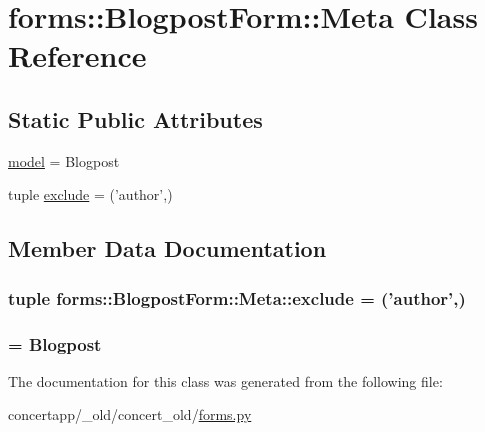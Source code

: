 \hypertarget{classforms_1_1_blogpost_form_1_1_meta}{
\section{forms::BlogpostForm::Meta Class Reference}
\label{classforms_1_1_blogpost_form_1_1_meta}
}
\subsection*{Static Public Attributes}
\begin{DoxyCompactItemize}
\item 
\hyperlink{classforms_1_1_blogpost_form_1_1_meta_ae7a64df056cc1bae6895793d175a61d8}{model} = Blogpost
\item 
tuple \hyperlink{classforms_1_1_blogpost_form_1_1_meta_ac6a46dfaa0b389a725a148c467872429}{exclude} = ('author',)
\end{DoxyCompactItemize}


\subsection{Member Data Documentation}
\hypertarget{classforms_1_1_blogpost_form_1_1_meta_ac6a46dfaa0b389a725a148c467872429}{
\subsubsection[{exclude}]{\setlength{\rightskip}{0pt plus 5cm}tuple {\bf forms::BlogpostForm::Meta::exclude} = ('author',)}}
\label{classforms_1_1_blogpost_form_1_1_meta_ac6a46dfaa0b389a725a148c467872429}
\hypertarget{classforms_1_1_blogpost_form_1_1_meta_ae7a64df056cc1bae6895793d175a61d8}{
\subsubsection[{model}]{ = Blogpost}}
\label{classforms_1_1_blogpost_form_1_1_meta_ae7a64df056cc1bae6895793d175a61d8}


The documentation for this class was generated from the following file:\begin{DoxyCompactItemize}
\item 
concertapp/\_\-old/concert\_\-old/\hyperlink{__old_2concert__old_2forms_8py}{forms.py}\end{DoxyCompactItemize}
